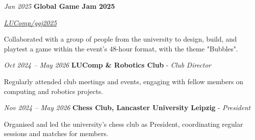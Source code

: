 \documentclass{cv}
\begin{document}
        \vspace{0.13 cm}

        \begin{twocolentry}{
        \textit{Jan 2025}}
            \textbf{Global Game Jam 2025}

            \textit{\href{https://github.com/LUComp/ggj2025}{LUComp/ggj2025}}
        \end{twocolentry}

        \vspace{0.10 cm}
        \begin{onecolentry}
            \begin{highlights}
                \item Collaborated with a group of people from the university to design, build, and playtest a game within the event's 48-hour format, with the theme "Bubbles".
            \end{highlights}
        \end{onecolentry}

        \vspace{0.13 cm}

        \begin{twocolentry}{
        \textit{Oct 2024 – May 2026}}
            \textbf{LUComp \& Robotics Club} - \textit{Club Director}
        \end{twocolentry}

        \vspace{0.10 cm}
        \begin{onecolentry}
            \begin{highlights}
                \item Regularly attended club meetings and events, engaging with fellow members on computing and robotics projects.
            \end{highlights}
        \end{onecolentry}

        \vspace{0.13 cm}

        \begin{twocolentry}{
        \textit{Nov 2024 – May 2026}}
            \textbf{Chess Club, Lancaster University Leipzig} - \textit{President}
        \end{twocolentry}

        \vspace{0.10 cm}
        \begin{onecolentry}
            \begin{highlights}
                \item Organised and led the university's chess club as President, coordinating regular sessions and matches for members.
            \end{highlights}
        \end{onecolentry}
\end{document}
